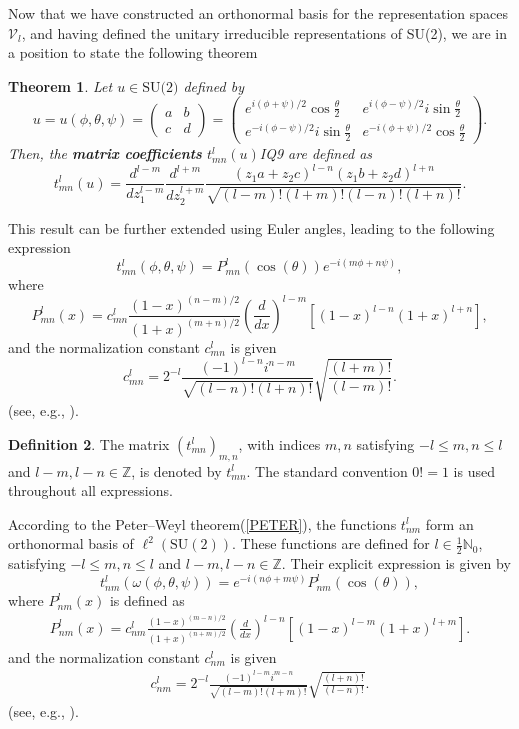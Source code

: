 \documentclass[11pt]{article}
\renewcommand\eqref[1]{(\ref{#1})} %
\newtheorem{thm}{Theorem}[section]
\theoremstyle{definition}
\newtheorem{defn}[thm]{Definition}
\theoremstyle{remark}
\numberwithin{equation}{section}
\begin{document}
Now that we have constructed an orthonormal basis for the representation spaces $\mathcal{V}_l$, and having defined the unitary irreducible representations of SU(2), we are in a position to state the following theorem
\begin{thm}
Let \( u \in  \text{SU(2)}  \) defined by
\[
u = u(\phi, \theta, \psi) = \begin{pmatrix} 
a & b \\
c & d 
\end{pmatrix} = \begin{pmatrix} 
e^{i(\phi+\psi)/2} \cos \frac{\theta}{2} & e^{i(\phi-\psi)/2} i \sin \frac{\theta}{2} \\
e^{-i(\phi-\psi)/2} i \sin \frac{\theta}{2} & e^{-i(\phi+\psi)/2} \cos \frac{\theta}{2} 
\end{pmatrix}.
\]
Then, the \textbf{matrix coefficients} \( t^l_{mn}(u) \)IQ9 are defined as
\[
t^l_{mn}(u) = \frac{d^{l-m}}{dz_1^{l-m}} \frac{d^{l+m}}{dz_2^{l+m}}  \frac{(z_1a + z_2c)^{l-n} (z_1b + z_2d)^{l+n}}{\sqrt{(l - m)!(l + m)!(l - n)!(l + n)!}}.
\]
\end{thm}




This result can be further extended using Euler angles, leading to the following expression
\[t_{mn}^l(\phi, \theta, \psi)=P_{mn}^l(\cos(\theta))e^{-i(m\phi+n\psi)},\]
where
\[
P_{mn}^l(x)=c_{mn}^l\frac{(1-x)^{(n-m)/2}}{(1+x)^{(m+n)/2}}\left( \frac{d}{dx}\right)^{l-m}[(1-x)^{l-n}(1+x)^{l+n}],
\]
and the normalization constant  $c_{mn}^l$ is given
\[c_{mn}^l=2^{-l}\frac{(-1)^{l-n}i^{n-m}}{\sqrt{(l-n)!(l+n)!}}\sqrt{\frac{(l+m)!}{(l-m)!}}.\]
(see, e.g., \cite{ruzhansky2009pseudo}).

\begin{defn}
The matrix $(t^l_{mn})_{m,n}$, with indices $m, n$ satisfying $-l \leq m, n \leq l$ and $l - m, l - n \in \mathbb{Z}$, is denoted by $t^l_{mn}$. The standard convention $0! = 1$ is used throughout all expressions.
\end{defn}
According to the Peter–Weyl theorem\eqref{PETER}, the functions $t^l_{nm}$ form an orthonormal basis of $\ell^2(\text{SU}(2))$\cite[p. 629]{ruzhansky2009pseudo}. These functions are defined for $l \in \frac{1}{2} \mathbb{N}_0$, satisfying $-l \leq m, n \leq l$ and $l - m, l - n \in \mathbb{Z}$. Their explicit expression is given by
\[
t^l_{nm}(\omega(\phi, \theta, \psi)) = e^{-i(n\phi + m\psi)} P^l_{nm}(\cos(\theta)),
\]
where $P^l_{nm}(x)$ is defined as
\begin{align}\label{Expresation P_mn^l}
    P_{nm}^l(x)=c^l_{nm}\frac{(1-x)^{(m-n)/2}}{(1+x)^{(n+m)/2}} \left( \frac{d}{dx}\right)^{l-n}[(1-x)^{l-m}(1+x)^{l+m}].
\end{align}
and the normalization constant $c^l_{nm}$ is given
\begin{align*}
    c^l_{nm}=2^{-l}\frac{(-1)^{l-m}i^{m-n}}{\sqrt{(l-m)!(l+m)!}}\sqrt{\frac{(l+n)!}{(l-n)!}} .
\end{align*}
(see, e.g., \cite{ruzhansky2009pseudo}).\\%
\end{document}
